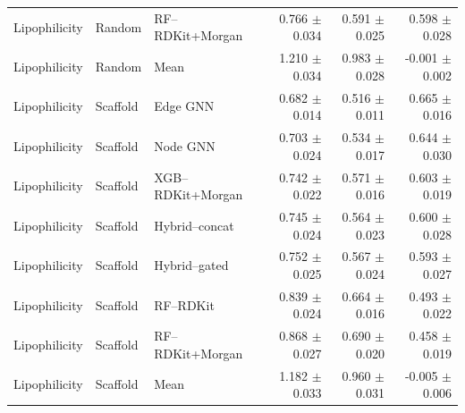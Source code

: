 \begin{tabular}{lllrrr}
Lipophilicity & Random & RF--RDKit+Morgan & 0.766 $\pm$ 0.034 & 0.591 $\pm$ 0.025 & 0.598 $\pm$ 0.028 \\
Lipophilicity & Random & Mean & 1.210 $\pm$ 0.034 & 0.983 $\pm$ 0.028 & -0.001 $\pm$ 0.002 \\
Lipophilicity & Scaffold & Edge GNN & 0.682 $\pm$ 0.014 & 0.516 $\pm$ 0.011 & 0.665 $\pm$ 0.016 \\
Lipophilicity & Scaffold & Node GNN & 0.703 $\pm$ 0.024 & 0.534 $\pm$ 0.017 & 0.644 $\pm$ 0.030 \\
Lipophilicity & Scaffold & XGB--RDKit+Morgan & 0.742 $\pm$ 0.022 & 0.571 $\pm$ 0.016 & 0.603 $\pm$ 0.019 \\
Lipophilicity & Scaffold & Hybrid--concat & 0.745 $\pm$ 0.024 & 0.564 $\pm$ 0.023 & 0.600 $\pm$ 0.028 \\
Lipophilicity & Scaffold & Hybrid--gated & 0.752 $\pm$ 0.025 & 0.567 $\pm$ 0.024 & 0.593 $\pm$ 0.027 \\
Lipophilicity & Scaffold & RF--RDKit & 0.839 $\pm$ 0.024 & 0.664 $\pm$ 0.016 & 0.493 $\pm$ 0.022 \\
Lipophilicity & Scaffold & RF--RDKit+Morgan & 0.868 $\pm$ 0.027 & 0.690 $\pm$ 0.020 & 0.458 $\pm$ 0.019 \\
Lipophilicity & Scaffold & Mean & 1.182 $\pm$ 0.033 & 0.960 $\pm$ 0.031 & -0.005 $\pm$ 0.006 \\
\bottomrule
\end{tabular}
